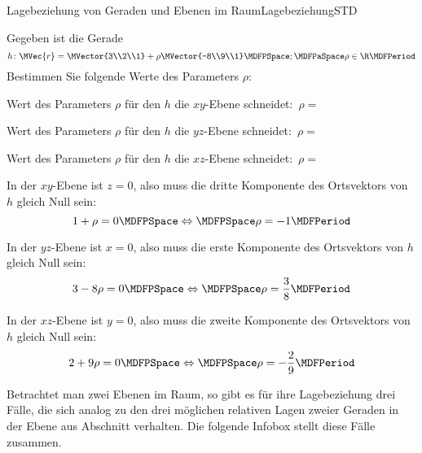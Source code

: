 \begin{MXContent}{Lagebeziehung von Geraden und Ebenen im Raum}{Lagebeziehung}{STD}
\begin{MExercise}
\begin{MHint}{\iSolution}
\end{MHint}


\end{MExercise}

\begin{MExercise}
Gegeben ist die Gerade
\[
 h\colon\MVec{r}=\MVector{3\\2\\1}+\rho\MVector{-8\\9\\1}\MDFPSpace;\MDFPaSpace\rho\in\R\MDFPeriod
\]
Bestimmen Sie folgende Werte des Parameters $\rho$:
\begin{MExerciseItems}
\item{Wert des Parameters $\rho$ für den $h$ die $x y$-Ebene schneidet:\ $\rho=$}
\item{Wert des Parameters $\rho$ für den $h$ die $y z$-Ebene schneidet:\ $\rho=$}
\item{Wert des Parameters $\rho$ für den $h$ die $x z$-Ebene schneidet:\ $\rho=$}
\end{MExerciseItems}

\begin{MHint}{\iSolution}
\begin{MExerciseItems}
\item{In der $x y$-Ebene ist $z=0$, also muss die dritte Komponente des Ortsvektors von $h$ gleich Null sein:
\[
 1+\rho=0\MDFPSpace\Leftrightarrow\MDFPSpace\rho=-1\MDFPeriod
\]
} 
\item{In der $y z$-Ebene ist $x=0$, also muss die erste Komponente des Ortsvektors von $h$ gleich Null sein:
\[
 3-8\rho=0\MDFPSpace\Leftrightarrow\MDFPSpace\rho=\frac{3}{8}\MDFPeriod
\]
} 
\item{In der $x z$-Ebene ist $y=0$, also muss die zweite Komponente des Ortsvektors von $h$ gleich Null sein:
\[
 2+9\rho=0\MDFPSpace\Leftrightarrow\MDFPSpace\rho=-\frac{2}{9}\MDFPeriod
\]
} 
\end{MExerciseItems}
 
\end{MHint}

\end{MExercise}

Betrachtet man zwei Ebenen im Raum, so gibt es für ihre Lagebeziehung drei Fälle, die sich analog zu den drei möglichen relativen Lagen zweier Geraden in der Ebene aus Abschnitt  verhalten. Die folgende Infobox stellt diese Fälle zusammen.


\end{MXContent}
